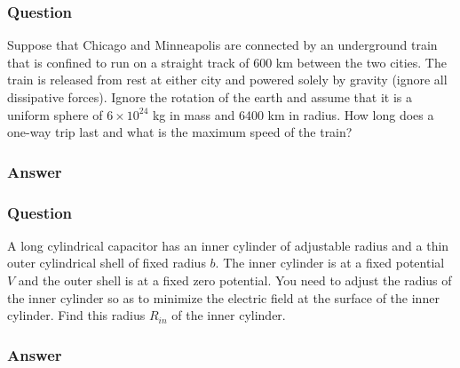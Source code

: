 \subsubsection{Question}
Suppose that Chicago and Minneapolis are connected by an underground train that is confined to run on a straight track of 600 km between the two cities. The train is released from rest at either city and powered solely by gravity (ignore all dissipative forces). Ignore the rotation of the earth and assume that it is a uniform sphere of $6\times10^24$ kg in mass and 6400 km in radius. How long does a one-way trip last and what is the maximum speed of the train?
\subsubsection{Answer}



\subsubsection{Question}
A long cylindrical capacitor has an inner cylinder of adjustable radius and a thin outer cylindrical shell of fixed radius $b$. The inner cylinder is at a fixed potential $V$ and the outer shell is at a fixed zero potential. You need to adjust the radius of the inner cylinder so as to minimize the electric field at the surface of the inner cylinder. Find this radius $R_{in}$ of the inner cylinder.
\subsubsection{Answer}


